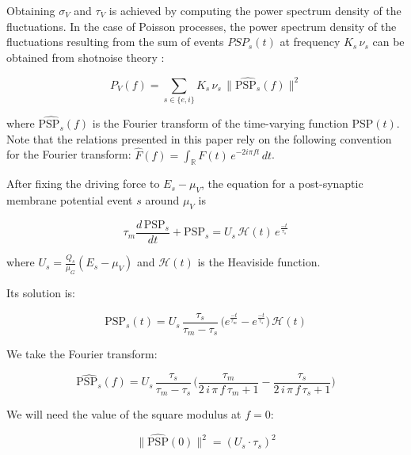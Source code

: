 \documentclass[8pt, colorlinks, a4paper]{article}
\begin{document}
Obtaining \( \sigma_V\) and \(\tau_V\) is achieved by computing the
power spectrum density of the fluctuations. In the case of Poisson
processes, the power spectrum density of the fluctuations resulting
from the sum of events \(PSP_{s}(t)\) at frequency \(K_{s} \, \nu_s\)
can be obtained from shotnoise theory \cite{Daley2007}:

\begin{equation}
  P_V(f)  = \sum_{s \in \{e,i\}} K_s \, \nu_{s} \, \| \hat{\mathrm{PSP}_s}(f) \|^2
\end{equation}

where \(\hat{\mathrm{PSP}_s}(f)\) is the Fourier transform of the
time-varying function \(\mathrm{PSP}(t)\). Note that the relations
presented in this paper rely on the following convention for the
Fourier transform:
\( \hat{F}(f) = \int_\mathbb{R} F(t) \, e^{- 2 i \pi f t} \, dt\).

After fixing the driving force to \(E_s - \mu_V\), the equation for a
post-synaptic membrane potential event \(s\) around \(\mu_V\) is

\begin{equation}
  \tau_m \frac{d \, \mathrm{PSP}_s }{dt} + \mathrm{PSP}_s = U_s \, \mathcal{H}(t) \, e^{\frac{-t}{\tau_s}}
\end{equation}

where \( U_s = \frac{Q_s}{\mu_G} (E_s - \mu_V) \) and
\( \mathcal{H}(t) \) is the Heaviside function.

Its solution is:

\begin{equation}
  \mathrm{PSP}_s(t)  = U_s \, \frac{\tau_s}{\tau_m - \tau_s} \, \big( 
  e^{\frac{-t}{\tau_m}} - e^{\frac{-t}{\tau_s}} \big) \, \mathcal{H}(t)
\end{equation}

We take the Fourier transform:

\begin{equation}
  \hat{\mathrm{PSP}_s}(f) = U_s \, \frac{\tau_s}{\tau_m - \tau_s} \, 
  \big(
  \frac{\tau_{m}}{2 \, i  \,  \pi \, f \, \tau_{m} +1} 
  - \frac{\tau_s}{2 \, i  \,  \pi \, f \, \tau_s +1} \big)
\end{equation}

We will need the value of the square modulus at \(f=0\):

\begin{equation}
  \label{eq:psp0}
  \| \hat{\mathrm{PSP}}(0) \|^2 = (U_s \cdot \tau_s)^2
\end{equation}
\end{document}
